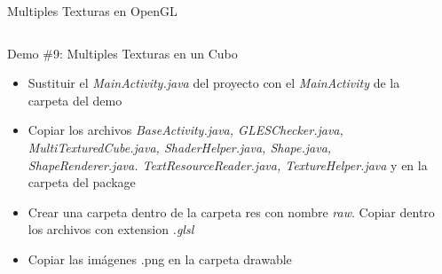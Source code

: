 \documentclass[aspectratio=169,compress]{beamer}
\begin{document}
\begin{frame}{Multiples Texturas en OpenGL}
\begin{columns}
\begin{column}{0.7\textwidth}
\begin{block}{Demo \#9: Multiples Texturas en un Cubo}
\begin{itemize}
\item Sustituir el \textit{MainActivity.java} del proyecto con el \textit{MainActivity} de la carpeta del demo
\item Copiar los archivos \textit{BaseActivity.java, GLESChecker.java, MultiTexturedCube.java, ShaderHelper.java, Shape.java, ShapeRenderer.java. TextResourceReader.java, TextureHelper.java} y en la carpeta del package
\item Crear una carpeta dentro de la carpeta res con nombre \textit{raw}. Copiar dentro los archivos con extension \textit{.glsl}
\item Copiar las imágenes .png en la carpeta drawable 
\end{itemize}
\end{block}
\end{column}
\begin{column}{0.3\textwidth}
\begin{center}

\end{center}
\end{column}
\end{columns}
\end{frame}
\end{document}
